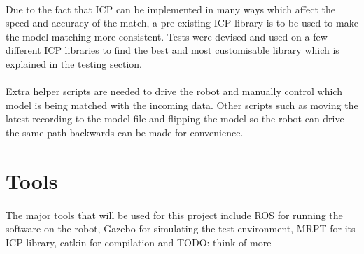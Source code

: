 \paragraph{}
Due to the fact that ICP can be implemented in many ways which affect the speed and accuracy of the match, a pre-existing ICP library is to be used to make the model matching more consistent. Tests were devised and used on a few different ICP libraries to find the best and most customisable library which is explained in the testing section.
\paragraph{}
Extra helper scripts are needed to drive the robot and manually control which model is being matched with the incoming data. Other scripts such as moving the latest recording to the model file and flipping the model so the robot can drive the same path backwards can be made for convenience.


\section{Tools}
\paragraph{}
The major tools that will be used for this project include ROS\cite{ROS} for running the software on the robot, Gazebo\cite{Gazebo} for simulating the test environment, MRPT\cite{Blanco-Claraco2019} for its ICP library\cite{MRPT-ICP}, catkin for compilation and TODO: think of more

